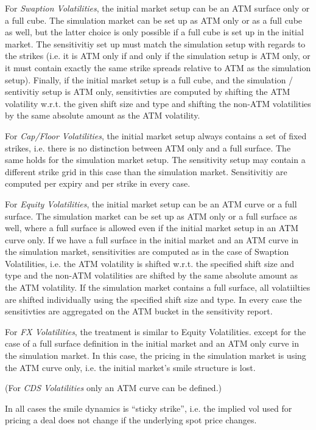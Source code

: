 \documentclass[12pt, a4paper]{article}
\begin{document}
\begin{appendix}
For {\em Swaption Volatilities}, the initial market setup can be an ATM surface only or a full cube. The simulation
market can be set up as ATM only or as a full cube as well, but the latter choice is only possible if a full cube is set
up in the initial market. The sensitivitiy set up must match the simulation setup with regards to the strikes (i.e. it
is ATM only if and only if the simulation setup is ATM only, or it must contain exactly the same strike spreads relative
to ATM as the simulation setup). Finally, if the initial market setup is a full cube, and the simulation / sentivitiy
setup is ATM only, sensitivties are computed by shifting the ATM volatility w.r.t. the given shift size and type and
shifting the non-ATM volatilities by the same absolute amount as the ATM volatility.

For {\em Cap/Floor Volatilities}, the initial market setup always contains a set of fixed strikes, i.e. there is no
distinction between ATM only and a full surface. The same holds for the simulation market setup. The sensitivity setup
may contain a different strike grid in this case than the simulation market. Sensitivitiy are computed per expiry and
per strike in every case.

For {\em Equity Volatilities}, the initial market setup can be an ATM curve or a full surface. The simulation market can
be set up as ATM only or a full surface as well, where a full surface is allowed even if the initial market setup in an
ATM curve only. If we have a full surface in the initial market and an ATM curve in the simulation market, sensitivities
are computed as in the case of Swaption Volatilities, i.e. the ATM volatility is shifted w.r.t. the specified shift size
and type and the non-ATM volatilities are shifted by the same absolute amount as the ATM volatility. If the simulation
market contains a full surface, all volatiilties are shifted individually using the specified shift size and type. In
every case the sensitivties are aggregated on the ATM bucket in the sensitivity report.

For {\em FX Volatilities}, the treatment is similar to Equity Volatilities. except for the case of a full surface
definition in the initial market and an ATM only curve in the simulation market. In this case, the pricing in the
simulation market is using the ATM curve only, i.e. the initial market's smile structure is lost.

(For {\em CDS Volatilities} only an ATM curve can be defined.)

In all cases the smile dynamics is ``sticky strike'', i.e. the implied vol used for pricing a deal does not change if
the underlying spot price changes.

\end{appendix}
\end{document}
